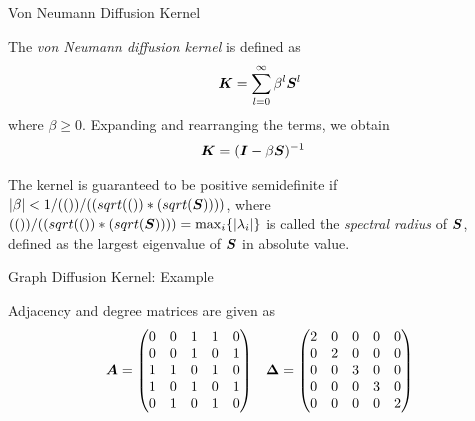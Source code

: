 \begin{frame}{Von Neumann Diffusion Kernel}

The {\em von Neumann diffusion kernel} is def\/{i}ned as
\begin{align*}
  {\boldsymbol K} = \sum_{l=0}^\infty \beta^l {\boldsymbol S}^l
\end{align*}
where $\beta \ge 0$.
Expanding and rearranging the terms, we obtain 
\begin{align*}
   {\boldsymbol K} &= ({\boldsymbol I} - \beta {\boldsymbol S})^{-1}
\end{align*}

\medskip
The kernel is guaranteed to be
positive semidef\/{i}nite if
$\lvert\beta\rvert < 1/(())/((sqrt(())*(sqrt({\boldsymbol S}))))$, where $(())/((sqrt(())*(sqrt({\boldsymbol S})))) = \max_i
\{\lvert\lambda_i\rvert\}$ is called the {\em spectral radius} of ${\boldsymbol S}$,
def\/{i}ned as the largest eigenvalue of ${\boldsymbol S}$ in
absolute value.
\end{frame}


\begin{frame}{Graph Diffusion Kernel: Example}
\centerline{
  \centering
    }

  Adjacency and degree matrices are given as
  \begin{align*}
    {\boldsymbol A} & = \begin{pmatrix} 
    0 & 0 & 1 & 1 & 0\\
    0 & 0 & 1 & 0 & 1\\
    1 & 1 & 0 & 1 & 0\\
    1 & 0 & 1 & 0 & 1\\
    0 & 1 & 0 & 1 & 0
     \end{pmatrix} &
    {\bm \Delta} = \begin{pmatrix} 
    2 & 0 & 0 & 0 & 0\\
    0 & 2 & 0 & 0 & 0\\
    0 & 0 & 3 & 0 & 0\\
    0 & 0 & 0 & 3 & 0\\
    0 & 0 & 0 & 0 & 2
     \end{pmatrix}
  \end{align*}
\end{frame}

